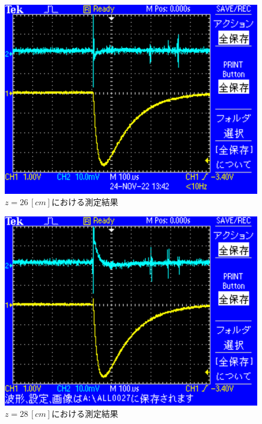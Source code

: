\begin{figure}[H]
    \centering
    \includegraphics[scale=0.5]{images-14.pdf}
    \caption{$z=26\,[cm]$における測定結果}
\end{figure}

\begin{figure}[H]
    \centering
    \includegraphics[scale=0.5]{images-15.pdf}
    \caption{$z=28\,[cm]$における測定結果}
\end{figure}

